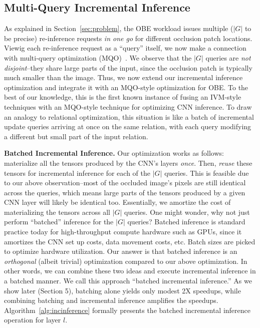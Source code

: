 \subsection{Multi-Query Incremental Inference}
As explained in Section~\ref{sec:problem}, the OBE workload issues multiple ($|G|$ to be precise) re-inference requests \textit{in one go} for different occlusion patch locations.
Viewig each re-inference request as a ``query'' itself, we now make a connection with multi-query optimization (MQO)~\cite{sellis}.
We observe that the $|G|$ queries are \textit{not disjoint}--they share large parts of the input, since the occlusion patch is typically much smaller than the image.
Thus, we now extend our incremental inference optimization and integrate it with an MQO-style optimization for OBE.
To the best of our knowledge, this is the first known instance of fusing an IVM-style techniques with an MQO-style technique for optimizing CNN inference.
To draw an analogy to relational optimization, this situation is like a batch of incremental update queries arriving at once on the same relation, with each query modifying a different but small part of the input relation.

\vspace{2mm}
\noindent \textbf{Batched Incremental Inference.}
Our optimization works as follows: materialize all the tensors produced by the CNN's layers \textit{once}. Then, \textit{reuse} these tensors for incremental inference for each of the $|G|$ queries. This is feasible due to our above observation--most of the occluded image's pixels are still identical across the queries, which means large parts of the tensors produced by a given CNN layer will likely be identical too. Essentially, we amortize the cost of materializing the tensors across all $|G|$ queries.
One might wonder, why not just perform ``batched'' inference for the $|G|$ queries? Batched inference is standard practice today for high-throughput compute hardware such as GPUs, since it amortizes the CNN set up costs, data movement costs, etc. Batch sizes are picked to optimize hardware utilization.
Our answer is that batched inference is an \textit{orthogonal} (albeit trivial) optimization compared to our above optimization.
In other words, we can combine these two ideas and execute incremental inference in a batched manner. We call this approach ``batched incremental inference.''
As we show later (Section 5), batching alone yields only modest 2X speedups, while combining batching and incremental inference amplifies the speedups.
Algorithm~\ref{alg:incinference} formally presents the batched incremental inference operation for layer $l$.

